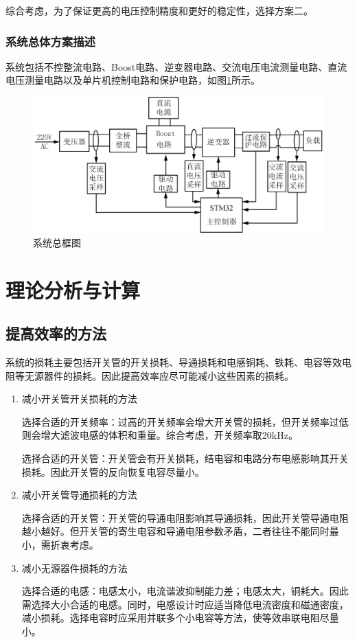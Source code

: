 \documentclass[12pt]{ctexart}
\begin{document}
综合考虑，为了保证更高的电压控制精度和更好的稳定性，选择方案二。

\subsubsection{系统总体方案描述}
系统包括不控整流电路、Boost电路、逆变器电路、交流电压电流测量电路、直流电压测量电路以及单片机控制电路和保护电路，如图\ref{system_block_diagram}所示。

\begin{figure}[htbp!]
  \centering
  \includegraphics[width=0.9\linewidth]{img/system block.png}
  \caption{系统总框图}
  \label{system_block_diagram}
\end{figure}

\section{理论分析与计算}
\subsection{提高效率的方法}
系统的损耗主要包括开关管的开关损耗、导通损耗和电感铜耗、铁耗、电容等效电阻等无源器件的损耗。因此提高效率应尽可能减小这些因素的损耗。

\begin{enumerate}[leftmargin=0pt,itemindent=!]
  \item 减小开关管开关损耗的方法
 
  \qquad 选择合适的开关频率：过高的开关频率会增大开关管的损耗，但开关频率过低则会增大滤波电感的体积和重量。综合考虑，开关频率取20kHz。

  \qquad 选择合适的开关管：开关管会有开关损耗，结电容和电路分布电感影响其开关损耗。因此开关管的反向恢复电容尽量小。

  \item 减小开关管导通损耗的方法
  
  \qquad 选择合适的开关管：开关管的导通电阻影响其导通损耗，因此开关管导通电阻越小越好。但开关管的寄生电容和导通电阻参数矛盾，二者往往不能同时最小，需折衷考虑。

  \item 减小无源器件损耗的方法
  
  \qquad 选择合适的电感：电感太小，电流谐波抑制能力差；电感太大，铜耗大。因此需选择大小合适的电感。同时，电感设计时应适当降低电流密度和磁通密度，减小损耗。选择电容时应采用并联多个小电容等方法，使等效串联电阻尽量小。
\end{enumerate}
\end{document}
